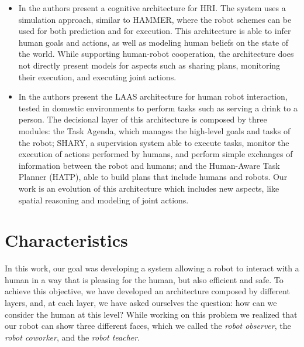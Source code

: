 \begin{itemize}
\item In \cite{BreazealGB09} the authors present a cognitive architecture for HRI. The system uses a simulation approach, similar to HAMMER, where the robot schemes can be used for both prediction and for execution. This architecture is able to infer human goals and actions, as well as modeling human beliefs on the state of the world. While supporting human-robot cooperation, the architecture does not directly present models for aspects such as sharing plans, monitoring their execution, and executing joint actions. 

\item In \cite{clodic2009shary} the authors present the LAAS architecture
 for human robot interaction, tested in domestic environments to
perform tasks such as serving a drink to a person. The decisional layer of this architecture
is composed by three modules: the Task Agenda, which manages the high-level goals and tasks of the 
robot; SHARY, a supervision system able to execute tasks, monitor the execution of actions performed by humans, and perform simple exchanges of information between the robot and humans; and the Human-Aware Task Planner (HATP), able to build plans that include humans and robots. Our work is an evolution of this architecture which includes new aspects, like spatial
reasoning and modeling of joint actions.

\end{itemize}

\section{Characteristics}
\label{sec:overview-characteristics}

In this work, our goal was developing a system allowing a robot to interact with a human in a way that is pleasing for the human, but also efficient and safe. To achieve this objective, we have developed an architecture composed by different layers, and, at each layer, we have asked ourselves the question: how can we consider the human at this level? While working on this problem we realized that our robot can show three different faces, which we called the \textit{robot observer}, the \textit{robot coworker}, and the \textit{robot teacher}.

